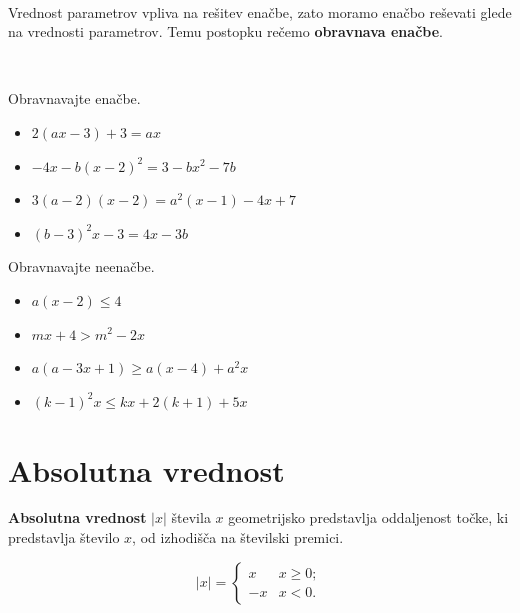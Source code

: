 ~
            
                Vrednost parametrov vpliva na rešitev enačbe, zato moramo enačbo reševati glede na vrednosti parametrov.
                Temu postopku rečemo \textbf{obravnava enačbe}.
            
        

~~~

        
            \begin{naloga}
                Obravnavajte enačbe.
                \begin{itemize}
                        \item $2(ax-3)+3=ax$ 
                        \item $-4x-b(x-2)^2=3-bx^2-7b$ 
                        \item $3(a-2)(x-2)=a^2(x-1)-4x+7$ 
                        \item $(b-3)^2x-3=4x-3b$ 
                \end{itemize}
            \end{naloga}
        

        
            \begin{naloga}
                Obravnavajte neenačbe.
                \begin{itemize}
                        \item $a(x-2)\leq 4$ 
                        \item $mx+4>m^2-2x$ 
                        \item $a(a-3x+1)\geq a(x-4)+a^2x$ 
                        \item $(k-1)^2x\leq kx+2(k+1)+5x$ 
                \end{itemize}
            \end{naloga}
        



\newpage

\section{Absolutna vrednost}

        
            \textbf{Absolutna vrednost} $|x|$ števila $x$ geometrijsko predstavlja oddaljenost točke, 
            ki predstavlja število $x$, od izhodišča na številski premici.
        

       
            $$|x|=\begin{cases} x &x\geq 0; \\ -x & x<0. \end{cases}$$
        

